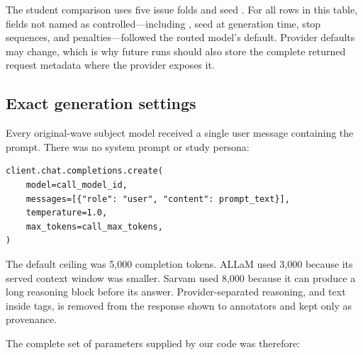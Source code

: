 \documentclass[11pt]{article}
\DeclareRobustCommand{\code}[1]{\texttt{\seqsplit{#1}}}
\begin{document}
The student comparison uses five issue folds and seed \code{20260825}. For all
rows in this table, fields not named as controlled---including \code{top\_p},
seed at generation time, stop sequences, and penalties---followed the routed
model's default. Provider defaults may change, which is why future runs should
also store the complete returned request metadata where the provider exposes it.

\subsection{Exact generation settings}

Every original-wave subject model received a single user message containing
the prompt. There was no system prompt or study persona:

\begin{lstlisting}
client.chat.completions.create(
    model=call_model_id,
    messages=[{"role": "user", "content": prompt_text}],
    temperature=1.0,
    max_tokens=call_max_tokens,
)
\end{lstlisting}

The default ceiling was 5,000 completion tokens. ALLaM used 3,000 because its
served context window was smaller. Sarvam used 8,000 because it can produce a
long reasoning block before its answer. Provider-separated reasoning, and text
inside \code{<think>} tags, is removed from the response shown to annotators and
kept only as provenance.

The complete set of parameters supplied by our code was therefore:
\end{document}
